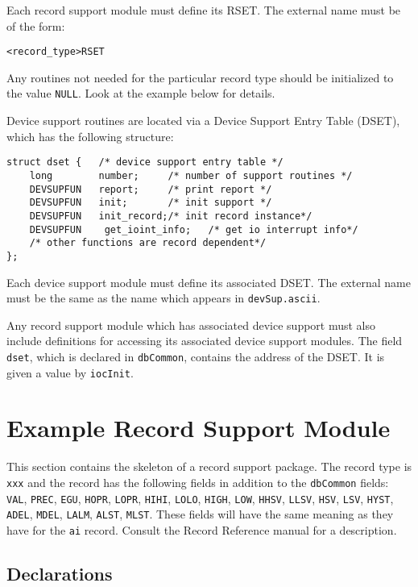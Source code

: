 Each record support module must define its RSET. The external name must be of the form:

\begin{verbatim}
<record_type>RSET
\end{verbatim}

Any routines not needed for the particular record type should be initialized to the value \verb|NULL|.
Look at the example below for details.

Device support routines are located via a Device Support Entry Table (DSET), which has the following structure:

\begin{verbatim}
struct dset {   /* device support entry table */
    long        number;     /* number of support routines */
    DEVSUPFUN   report;     /* print report */
    DEVSUPFUN   init;       /* init support */
    DEVSUPFUN   init_record;/* init record instance*/
    DEVSUPFUN    get_ioint_info;   /* get io interrupt info*/
    /* other functions are record dependent*/
};
\end{verbatim}

Each device support module must define its associated DSET.
The external name must be the same as the name which appears in \verb|devSup.ascii|.

Any record support module which has associated device support must also include definitions for accessing its associated device support modules.
The field \verb|dset|, which is declared in \verb|dbCommon|, contains the address of the DSET.
It is given a value by \verb|iocInit|.

\section{Example Record Support Module}

This section contains the skeleton of a record support package.
The record type is \verb|xxx| and the record has the following fields in addition to the \verb|dbCommon| fields:
\verb|VAL|, \verb|PREC|, \verb|EGU|, \verb|HOPR|, \verb|LOPR|, \verb|HIHI|, \verb|LOLO|, \verb|HIGH|, \verb|LOW|, \verb|HHSV|, \verb|LLSV|, \verb|HSV|, \verb|LSV|, \verb|HYST|, \verb|ADEL|, \verb|MDEL|, \verb|LALM|, \verb|ALST|, \verb|MLST|.
These fields will have the same meaning as they have for the \verb|ai| record.
Consult the Record Reference manual for a description.

\subsection{Declarations}


